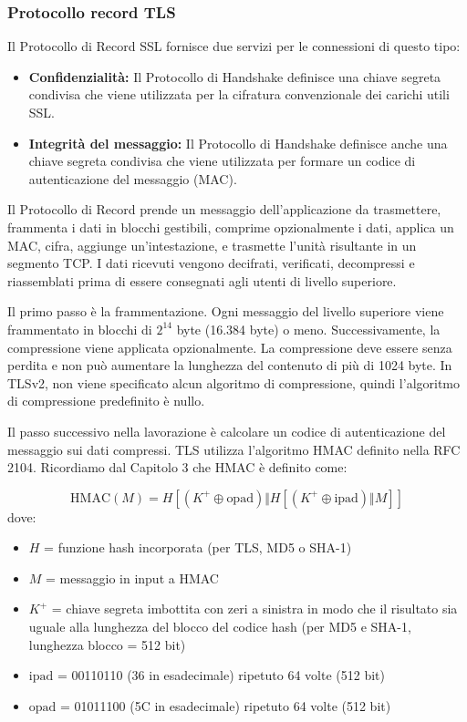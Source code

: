 \documentclass{article}
\theoremstyle{definition}
\begin{document}
\subsubsection{Protocollo record TLS}
Il Protocollo di Record SSL fornisce due servizi per le connessioni di questo tipo:

\begin{itemize}
    \item \textbf{Confidenzialità:} Il Protocollo di Handshake definisce una chiave segreta condivisa che viene utilizzata per la cifratura convenzionale dei carichi utili SSL.
    \item \textbf{Integrità del messaggio:} Il Protocollo di Handshake definisce anche una chiave segreta condivisa che viene utilizzata per formare un codice di autenticazione del messaggio (MAC).
\end{itemize}

Il Protocollo di Record prende un messaggio dell'applicazione da trasmettere, frammenta i dati in blocchi gestibili, comprime opzionalmente i dati, applica un MAC, cifra, aggiunge un'intestazione, e trasmette l'unità risultante in un segmento TCP. I dati ricevuti vengono decifrati, verificati, decompressi e riassemblati prima di essere consegnati agli utenti di livello superiore.

Il primo passo è la frammentazione. Ogni messaggio del livello superiore viene frammentato in blocchi di \(2^{14}\) byte (16.384 byte) o meno. Successivamente, la compressione viene applicata opzionalmente. La compressione deve essere senza perdita e non può aumentare la lunghezza del contenuto di più di 1024 byte. In TLSv2, non viene specificato alcun algoritmo di compressione, quindi l'algoritmo di compressione predefinito è nullo.

Il passo successivo nella lavorazione è calcolare un codice di autenticazione del messaggio sui dati compressi. TLS utilizza l'algoritmo HMAC definito nella RFC 2104. Ricordiamo dal Capitolo 3 che HMAC è definito come:

\[ \text{HMAC}(M) = H[(K^+ \oplus \text{opad}) \Vert H[(K^+ \oplus \text{ipad}) \Vert M]] \]
dove:
\begin{itemize}
    \item \( H \) = funzione hash incorporata (per TLS, MD5 o SHA-1)
    \item \( M \) = messaggio in input a HMAC
    \item \( K^+ \) = chiave segreta imbottita con zeri a sinistra in modo che il risultato sia uguale alla lunghezza del blocco del codice hash (per MD5 e SHA-1, lunghezza blocco = 512 bit)
    \item \( \text{ipad} \) = 00110110 (36 in esadecimale) ripetuto 64 volte (512 bit)
    \item \( \text{opad} \) = 01011100 (5C in esadecimale) ripetuto 64 volte (512 bit)
\end{itemize}
\end{document}
